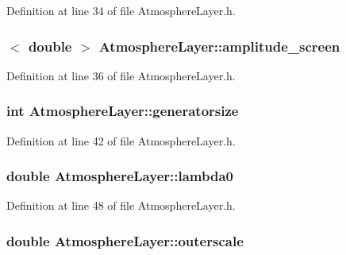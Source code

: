 Definition at line 34 of file AtmosphereLayer.h.

\hypertarget{classAtmosphereLayer_a88963962454982df3760e2d4b0ff8463}{
\subsubsection[{amplitude\_\-screen}]{$<$ double $>$ {\bf AtmosphereLayer::amplitude\_\-screen}}}
\label{classAtmosphereLayer_a88963962454982df3760e2d4b0ff8463}


Definition at line 36 of file AtmosphereLayer.h.

\hypertarget{classAtmosphereLayer_af7a8b5a4fb4998b3ed4ad564faa78280}{
\subsubsection[{generatorsize}]{\setlength{\rightskip}{0pt plus 5cm}int {\bf AtmosphereLayer::generatorsize}}}
\label{classAtmosphereLayer_af7a8b5a4fb4998b3ed4ad564faa78280}


Definition at line 42 of file AtmosphereLayer.h.

\hypertarget{classAtmosphereLayer_ad06e6f68425560b65b47713c5d871bc8}{
\subsubsection[{lambda0}]{\setlength{\rightskip}{0pt plus 5cm}double {\bf AtmosphereLayer::lambda0}}}
\label{classAtmosphereLayer_ad06e6f68425560b65b47713c5d871bc8}


Definition at line 48 of file AtmosphereLayer.h.

\hypertarget{classAtmosphereLayer_ac9e60f4a28316e69c292e2e0af10e476}{
\subsubsection[{outerscale}]{\setlength{\rightskip}{0pt plus 5cm}double {\bf AtmosphereLayer::outerscale}}}
\label{classAtmosphereLayer_ac9e60f4a28316e69c292e2e0af10e476}


